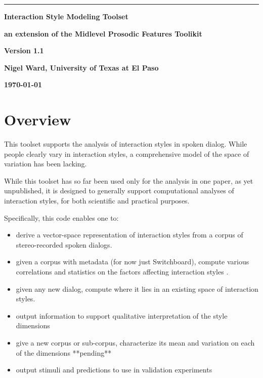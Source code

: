 \documentclass[11pt]{article}
\begin{document}
\noindent
\thispagestyle{empty}
\sloppy

\rule{1mm}{0mm}

\vspace{-17mm}
{\LARGE \bf Interaction Style Modeling  Toolset }

\smallskip
{\large \bf an extension of the  Midlevel Prosodic Features Toolikit}
\medskip


{\LARGE \bf Version 1.1}
\vspace{7mm}


{\bf Nigel Ward, University of Texas at El Paso}

{\bf \today }
\bigskip


\vspace{-3.5ex}
\section{Overview}    \label{sec:overview}

This toolset supports the analysis of interaction styles in spoken
dialog.  While people clearly vary in interaction styles, a
comprehensive model of the space of variation has been lacking.

While this toolset has so far been used only for the analysis in one
paper, as yet unpublished, it is designed to generally support
computational analyses of interaction styles, for both scientific and
practical purposes.

Specifically, this code enables one to:

\begin{itemize}   \setlength{\itemsep}{0pt}\setlength{\parskip}{0pt}
\item derive a vector-space representation of interaction styles from
  a corpus of stereo-recorded spoken dialogs.
\item given a corpus with metadata (for now just  Switchboard), compute various
  correlations and statistics on the factors affecting interaction styles .
\item given any new dialog, compute where it lies in an existing space
  of interaction styles.
\item output information to support qualitative interpretation of the
  style dimensions
\item give a new corpus or sub-corpus, characterize its mean and
  variation on each of the dimensions **pending**
\item output stimuli and predictions to use in validation experiments
\end{itemize}
\end{document}
